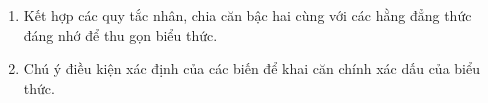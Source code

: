 \begin{enumerate}
\item Kết hợp các quy tắc nhân, chia căn bậc hai cùng với các hằng đẳng thức đáng nhớ để thu gọn biểu thức.
\item Chú ý điều kiện xác định của các biến để khai căn chính xác dấu của biểu thức.
\end{enumerate}
